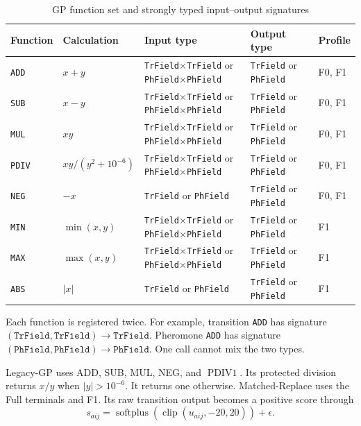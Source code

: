 \documentclass[letterpaper,journal]{IEEEtran}
\begin{document}
\begin{table}[t]
\caption{GP function set and strongly typed input--output signatures}
\label{tab:functions}
\centering
\footnotesize
\renewcommand{\arraystretch}{1.16}
\setlength{\tabcolsep}{4pt}
\begin{tabular}{L{18mm}L{38mm}L{55mm}L{35mm}L{18mm}}
\toprule
Function & Calculation & Input type & Output type & Profile\\
\midrule
\texttt{ADD} & \(x+y\) &
\texttt{TrField}\(\times\)\texttt{TrField} or
\texttt{PhField}\(\times\)\texttt{PhField} &
\texttt{TrField} or \texttt{PhField} & F0, F1\\
\texttt{SUB} & \(x-y\) &
\texttt{TrField}\(\times\)\texttt{TrField} or
\texttt{PhField}\(\times\)\texttt{PhField} &
\texttt{TrField} or \texttt{PhField} & F0, F1\\
\texttt{MUL} & \(xy\) &
\texttt{TrField}\(\times\)\texttt{TrField} or
\texttt{PhField}\(\times\)\texttt{PhField} &
\texttt{TrField} or \texttt{PhField} & F0, F1\\
\texttt{PDIV} & \(xy/(y^2+10^{-6})\) &
\texttt{TrField}\(\times\)\texttt{TrField} or
\texttt{PhField}\(\times\)\texttt{PhField} &
\texttt{TrField} or \texttt{PhField} & F0, F1\\
\texttt{NEG} & \(-x\) &
\texttt{TrField} or \texttt{PhField} &
\texttt{TrField} or \texttt{PhField} & F0, F1\\
\texttt{MIN} & \(\min(x,y)\) &
\texttt{TrField}\(\times\)\texttt{TrField} or
\texttt{PhField}\(\times\)\texttt{PhField} &
\texttt{TrField} or \texttt{PhField} & F1\\
\texttt{MAX} & \(\max(x,y)\) &
\texttt{TrField}\(\times\)\texttt{TrField} or
\texttt{PhField}\(\times\)\texttt{PhField} &
\texttt{TrField} or \texttt{PhField} & F1\\
\texttt{ABS} & \(|x|\) &
\texttt{TrField} or \texttt{PhField} &
\texttt{TrField} or \texttt{PhField} & F1\\
\bottomrule
\end{tabular}
\end{table}

Each function is registered twice.
For example, transition \texttt{ADD} has signature
\((\texttt{TrField},\texttt{TrField})\to\texttt{TrField}\).
Pheromone \texttt{ADD} has signature
\((\texttt{PhField},\texttt{PhField})\to\texttt{PhField}\).
One call cannot mix the two types.

Legacy-GP uses ADD, SUB, MUL, NEG, and \(\operatorname{PDIV1}\).
Its protected division returns \(x/y\) when \(|y|>10^{-6}\).
It returns one otherwise.
Matched-Replace uses the Full terminals and F1.
Its raw transition output becomes a positive score through
\begin{equation}
    s_{aij}=\operatorname{softplus}(\operatorname{clip}(u_{aij},-20,20))+\epsilon.
\end{equation}
\end{document}
